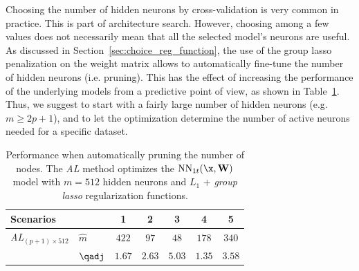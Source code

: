 Choosing the number of hidden neurons by cross-validation is very common in practice. This is part of architecture search. However, choosing among a few values does not necessarily mean that all the selected model's neurons are useful. As discussed in Section~\ref{sec:choice_reg_function}, the use of the group lasso penalization on the weight matrix allows to automatically fine-tune the number of hidden neurons (i.e. pruning). This has the effect of increasing the performance of the underlying models from a predictive point of view, as shown in Table~\ref{tab:hidden_neurons_pruning}. Thus, we suggest to start with a fairly large number of hidden neurons (e.g. $m \geq 2p +1$), and to let the optimization determine the number of active neurons needed for a specific dataset.

\begin{table}[!ht]
    \centering
    \caption{Performance when automatically pruning the number of nodes. The {\it AL} method optimizes the $\mathrm{NN}_{1t}(\x, \mathbf{W})$ model with $m=512$ hidden neurons and $L_1$ + \emph{group lasso} regularization functions.}
    \label{tab:hidden_neurons_pruning}
    \begin{tabular}{l|l|ccccc}
        Scenarios & & 1 & 2 & 3 & 4 & 5\\
        \hline
        {\it AL$_{(p+1)\times 512}$} 
        & $\hat{m}$ & $422$  & $97$ & $48$ & $178$ & $340$ \\
        & $\qadj$ & $1.67$  & $2.63$ & $5.03$ & $1.35$ & $3.58$\\
        \hline
    \end{tabular}
\end{table}


